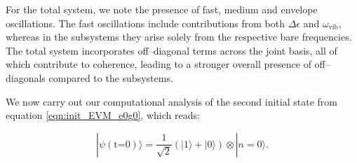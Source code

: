 \documentclass[11pt]{article}
\newcounter{subsubsubsection}[subsubsection]
\begin{document}
For the total system, we note the presence of fast, medium and envelope oscillations. The fast oscillations include contributions from both $\Delta\epsilon$ and $\omega_{\scriptscriptstyle \text{vib}}$, whereas in the subsystems they arise solely from the respective bare frequencies. The total system incorporates off--diagonal terms across the joint basis, all of which contribute to coherence, leading to a stronger overall presence of off--diagonals compared to the subsystems.

 \label{EVM_CQS_case2}

We now carry out our computational analysis of the second initial state from equation \ref{eqn:init_EVM_e0g0}, which reads:

\begin{equation*}
    |\psi (\text{t=0})\rangle = \frac{1}{\sqrt{2}}(|1\rangle + |0\rangle)\otimes|n=0\rangle.
\end{equation*}
\end{document}
